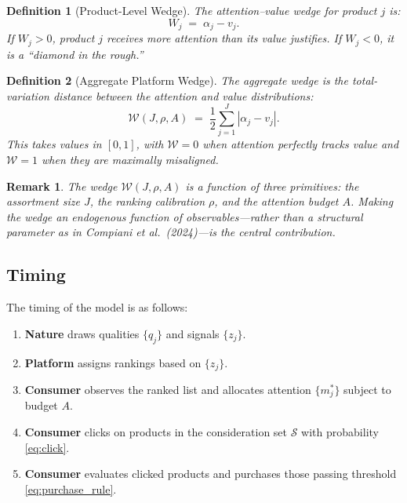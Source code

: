 \documentclass[12pt]{article}
\newtheorem{definition}{Definition}
\newtheorem{remark}{Remark}
\begin{document}
\begin{definition}[Product-Level Wedge]\label{def:product_wedge}
The \emph{attention--value wedge} for product $j$ is:
\begin{equation}\label{eq:product_wedge}
    W_j \;=\; \alpha_j - v_j.
\end{equation}
If $W_j > 0$, product $j$ receives more attention than its value justifies. If $W_j < 0$, it is a ``diamond in the rough.''
\end{definition}

\begin{definition}[Aggregate Platform Wedge]\label{def:platform_wedge}
The \emph{aggregate wedge} is the total-variation distance between the attention and value distributions:
\begin{equation}\label{eq:platform_wedge}
    \mathcal{W}(J, \rho, A) \;=\; \frac{1}{2}\sum_{j=1}^{J} |\alpha_j - v_j|.
\end{equation}
This takes values in $[0, 1]$, with $\mathcal{W} = 0$ when attention perfectly tracks value and $\mathcal{W} = 1$ when they are maximally misaligned.
\end{definition}

\begin{remark}
The wedge $\mathcal{W}(J, \rho, A)$ is a function of three primitives: the assortment size $J$, the ranking calibration $\rho$, and the attention budget $A$. Making the wedge an endogenous function of observables---rather than a structural parameter as in Compiani et al.\ (2024)---is the central contribution.
\end{remark}

\subsection{Timing}\label{sec:timing}

The timing of the model is as follows:
\begin{enumerate}
    \item \textbf{Nature} draws qualities $\{q_j\}$ and signals $\{z_j\}$.
    \item \textbf{Platform} assigns rankings based on $\{z_j\}$.
    \item \textbf{Consumer} observes the ranked list and allocates attention $\{m_j^*\}$ subject to budget $A$.
    \item \textbf{Consumer} clicks on products in the consideration set $\mathcal{S}$ with probability \eqref{eq:click}.
    \item \textbf{Consumer} evaluates clicked products and purchases those passing threshold \eqref{eq:purchase_rule}.
\end{enumerate}
\end{document}

